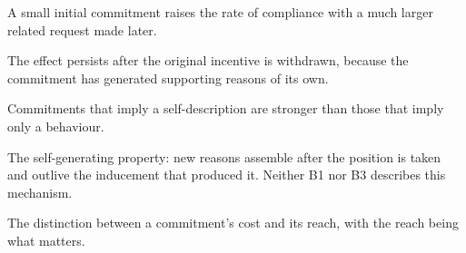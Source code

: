 

\begin{distilled}
  \item A small initial commitment raises the rate of compliance with a much larger related request made later.
  \item The effect persists after the original incentive is withdrawn, because the commitment has generated supporting reasons of its own.
  \item Commitments that imply a self-description are stronger than those that imply only a behaviour.
\end{distilled}

\begin{unique}
  \item The self-generating property: new reasons assemble after the position is taken and outlive the inducement that produced it. Neither B1 nor B3 describes this mechanism.
  \item The distinction between a commitment's cost and its reach, with the reach being what matters.
\end{unique}
